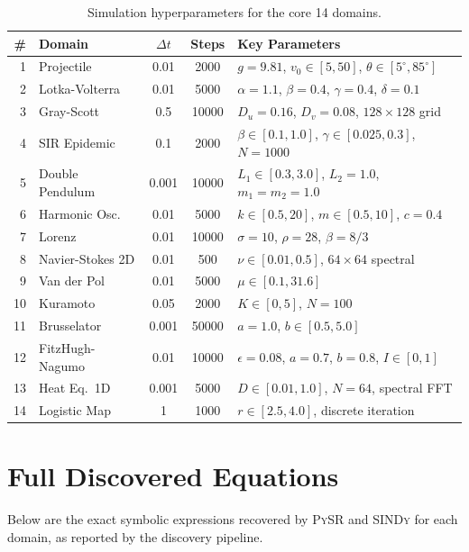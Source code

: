 \documentclass{article}
\newcommand{\pysr}{\textsc{PySR}}
\newcommand{\sindy}{\textsc{SINDy}}
\begin{document}
\begin{table}[h]
\centering
\caption{Simulation hyperparameters for the core 14 domains.}
\label{tab:hyperparams}
\small
\begin{tabular}{rlccl}
\toprule
\# & Domain & $\Delta t$ & Steps & Key Parameters \\
\midrule
1 & Projectile & 0.01 & 2000 & $g=9.81$, $v_0 \in [5, 50]$, $\theta \in [5^\circ, 85^\circ]$ \\
2 & Lotka-Volterra & 0.01 & 5000 & $\alpha=1.1$, $\beta=0.4$, $\gamma=0.4$, $\delta=0.1$ \\
3 & Gray-Scott & 0.5 & 10000 & $D_u=0.16$, $D_v=0.08$, $128 \times 128$ grid \\
4 & SIR Epidemic & 0.1 & 2000 & $\beta \in [0.1, 1.0]$, $\gamma \in [0.025, 0.3]$, $N=1000$ \\
5 & Double Pendulum & 0.001 & 10000 & $L_1 \in [0.3, 3.0]$, $L_2 = 1.0$, $m_1 = m_2 = 1.0$ \\
6 & Harmonic Osc. & 0.01 & 5000 & $k \in [0.5, 20]$, $m \in [0.5, 10]$, $c = 0.4$ \\
7 & Lorenz & 0.01 & 10000 & $\sigma=10$, $\rho=28$, $\beta=8/3$ \\
8 & Navier-Stokes 2D & 0.01 & 500 & $\nu \in [0.01, 0.5]$, $64 \times 64$ spectral \\
9 & Van der Pol & 0.01 & 5000 & $\mu \in [0.1, 31.6]$ \\
10 & Kuramoto & 0.05 & 2000 & $K \in [0, 5]$, $N = 100$ \\
11 & Brusselator & 0.001 & 50000 & $a = 1.0$, $b \in [0.5, 5.0]$ \\
12 & FitzHugh-Nagumo & 0.01 & 10000 & $\epsilon=0.08$, $a=0.7$, $b=0.8$, $I \in [0, 1]$ \\
13 & Heat Eq.\ 1D & 0.001 & 5000 & $D \in [0.01, 1.0]$, $N=64$, spectral FFT \\
14 & Logistic Map & 1 & 1000 & $r \in [2.5, 4.0]$, discrete iteration \\
\bottomrule
\end{tabular}
\end{table}

\section{Full Discovered Equations}
\label{app:equations}

Below are the exact symbolic expressions recovered by \pysr{} and \sindy{}
for each domain, as reported by the discovery pipeline.
\end{document}
